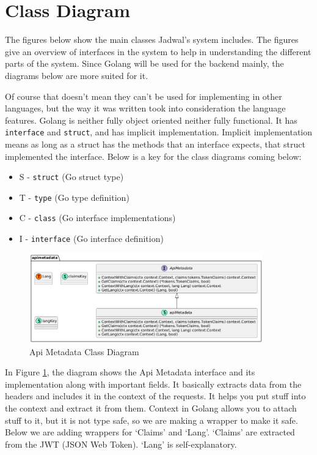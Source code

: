 \section{Class Diagram}

The figures below show the main classes Jadwal's system includes. The figures give an overview of interfaces in the system to help in understanding the different parts of the system. Since Golang will be used for the backend mainly, the diagrams below are more suited for it.

Of course that doesn't mean they can't be used for implementing in other languages, but the way it was written took into consideration the language features. Golang is neither fully object oriented neither fully functional. It has \texttt{interface} and \texttt{struct}, and has implicit implementation. Implicit implementation means as long as a struct has the methods that an interface expects, that struct implemented the interface. Below is a key for the class diagrams coming below:
\begin{itemize}
    \item S - \texttt{struct} (Go struct type)
    \item T - \texttt{type} (Go type definition)
    \item C - \texttt{class} (Go interface implementations)
    \item I - \texttt{interface} (Go interface definition)
\end{itemize}

\newpage

\begin{figure}[!h]
    \centering
    \includegraphics[width=0.9\textwidth]{images/docs/diagrams/class/class-diagram/apimetadata.png}
    \caption{Api Metadata Class Diagram}
    \label{fig:api-metadata-class-diagram}
\end{figure}

In Figure \ref{fig:api-metadata-class-diagram}, the diagram shows the Api Metadata interface and its implementation along with important fields. It basically extracts data from the headers and includes it in the context of the requests. It helps you put stuff into the context and extract it from them. Context in Golang allows you to attach stuff to it, but it is not type safe, so we are making a wrapper to make it safe. Below we are adding wrappers for `Claims' and `Lang'. `Claims' are extracted from the JWT (JSON Web Token). `Lang' is self-explanatory.

